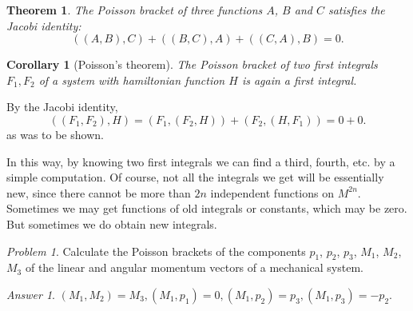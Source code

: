\documentclass{book}
\numberwithin{equation}{section}
\theoremstyle{plain}
\newtheorem*{thm*}{Theorem}
\newtheorem*{cor*}{Corollary}
\let\oldendproof\endproof
\renewenvironment{proof}[1][\proofname]{%
  \oldproof[\textsc{#1}]%
}{\oldendproof}
\theoremstyle{definition}
\theoremstyle{remark}
\theoremstyle{smallcap}
\newtheorem*{prob*}{Problem}
\numberwithin{prob}{section}
\newtheorem*{ans*}{Answer}
\begin{document}
\begin{thm*}
  The Poisson bracket of three functions $A$, $B$ and $C$
  satisfies the Jacobi identity:
  $$
  ((A, B), C) + ((B, C), A) + ((C, A), B) = 0.
  $$
\end{thm*}

\begin{cor*}[Poisson's theorem]
  The Poisson bracket of two first integrals $F_1, F_2$
  of a system with hamiltonian function $H$
  is again a first integral.
\end{cor*}

\begin{proof}[Proof of the corollary]
  By the Jacobi identity,
  $$
  ((F_1, F_2), H)
  =
  (F_1, (F_2, H))
  +
  (F_2, (H, F_1)) = 0 + 0.
  $$
  as was to be shown.
\end{proof}

In this way, by knowing two first integrals we can find a third, fourth, etc.
by a simple computation.
%
Of course, not all the integrals we get will be essentially new,
since there cannot be more than $2n$ independent functions on $M^{2n}$.
%
Sometimes we may get functions of old integrals or constants,
which may be zero.
%
But sometimes we do obtain new integrals.

\begin{prob*}
  Calculate the Poisson brackets of the components
  $p_1$, $p_2$, $p_3$, $M_1$, $M_2$, $M_3$ of the
  linear and angular momentum vectors of
  a mechanical system.

  \begin{ans*}
    $(M_1, M_2) = M_3, (M_1, p_1) = 0, (M_1, p_2) = p_3, (M_1, p_3) = -p_2.$
  \end{ans*}

\end{prob*}
\end{document}
